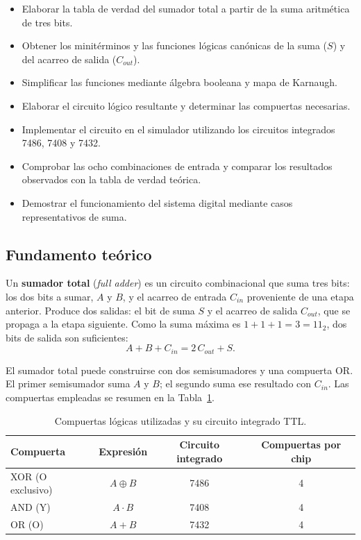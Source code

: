 \documentclass[10pt]{article}
\begin{document}
\begin{itemize}
  \item Elaborar la tabla de verdad del sumador total a partir de la suma
        aritmética de tres bits.
  \item Obtener los minitérminos y las funciones lógicas canónicas de la suma
        ($S$) y del acarreo de salida ($C_{out}$).
  \item Simplificar las funciones mediante álgebra booleana y mapa de Karnaugh.
  \item Elaborar el circuito lógico resultante y determinar las compuertas
        necesarias.
  \item Implementar el circuito en el simulador utilizando los circuitos
        integrados 7486, 7408 y 7432.
  \item Comprobar las ocho combinaciones de entrada y comparar los resultados
        observados con la tabla de verdad teórica.
  \item Demostrar el funcionamiento del sistema digital mediante casos
        representativos de suma.
\end{itemize}

\subsection{Fundamento teórico}

Un \textbf{sumador total} (\textit{full adder}) es un circuito combinacional
que suma tres bits: los dos bits a sumar, $A$ y $B$, y el acarreo de entrada
$C_{in}$ proveniente de una etapa anterior. Produce dos salidas: el bit de suma
$S$ y el acarreo de salida $C_{out}$, que se propaga a la etapa siguiente. Como
la suma máxima es $1+1+1=3=11_2$, dos bits de salida son suficientes:
\begin{equation}
  A + B + C_{in} = 2\,C_{out} + S .
\end{equation}

El sumador total puede construirse con dos semisumadores y una compuerta OR. El
primer semisumador suma $A$ y $B$; el segundo suma ese resultado con $C_{in}$.
Las compuertas empleadas se resumen en la Tabla~\ref{tab:compuertas}.

\begin{table}[!htbp]
  \centering
  \caption{Compuertas lógicas utilizadas y su circuito integrado TTL.}
  \label{tab:compuertas}
  \begin{tabular}{lccc}
    \toprule
    Compuerta & Expresión & Circuito integrado & Compuertas por chip \\
    \midrule
    XOR (O exclusivo) & $A \oplus B$ & 7486 & 4 \\
    AND (Y)           & $A \cdot B$  & 7408 & 4 \\
    OR (O)            & $A + B$      & 7432 & 4 \\
    \bottomrule
  \end{tabular}
\end{table}
\end{document}
